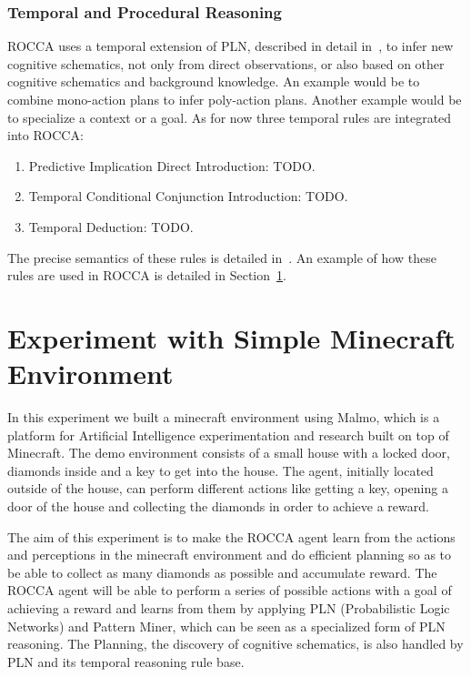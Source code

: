 \documentclass[runningheads]{llncs}
\begin{document}
\subsubsection{Temporal and Procedural Reasoning}

ROCCA uses a temporal extension of PLN, described in detail
in~\cite{Geisweiller2023TPLN}, to infer new cognitive schematics, not
only from direct observations, or also based on other cognitive
schematics and background knowledge.  An example would be to combine
mono-action plans to infer poly-action plans.  Another example would
be to specialize a context or a goal.  As for now three temporal rules
are integrated into ROCCA:

\begin{enumerate}
\item Predictive Implication Direct Introduction: TODO.
\item Temporal Conditional Conjunction Introduction: TODO.
\item Temporal Deduction: TODO.
\end{enumerate}

The precise semantics of these rules is detailed
in~\cite{Geisweiller2023TPLN}.  An example of how these rules are used
in ROCCA is detailed in Section~\ref{sec:minecraft}.

\section{Experiment with Simple Minecraft Environment}
\label{sec:minecraft}
In this experiment we built a minecraft environment using Malmo, which is a platform for Artificial Intelligence experimentation and research built on top of Minecraft. The demo environment consists of a small house with a locked door, diamonds inside and a key to get into the house. The agent, initially located outside of the house, can perform different actions like getting a key, opening a door of the house and collecting the diamonds in order to achieve a reward. \par
The aim of this experiment is to make the ROCCA agent learn from the actions and perceptions in the minecraft environment and do efficient planning so as to be able to collect as many diamonds as possible and accumulate reward. The ROCCA agent will be able to perform a series of possible actions with a goal of achieving a reward and learns from them by applying PLN (Probabilistic Logic Networks) and Pattern Miner, which can be seen as a specialized form of PLN reasoning. The Planning, the discovery of cognitive schematics, is also handled by PLN and its temporal reasoning rule base.
\end{document}
